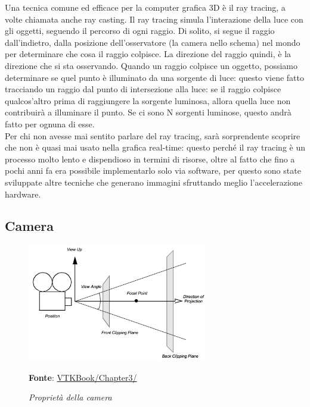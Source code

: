 Una tecnica comune ed efficace per la computer grafica 3D è il ray tracing, a volte chiamata anche ray casting. Il ray tracing simula l'interazione della luce con gli oggetti, seguendo il percorso di ogni raggio. Di solito, si segue il raggio dall'indietro, dalla posizione dell'osservatore (la camera nello schema) nel mondo per determinare che cosa il raggio colpisce. La direzione del raggio quindi, è la direzione che si sta osservando. Quando un raggio colpisce un oggetto, possiamo determinare se quel punto è illuminato da una sorgente di luce: questo viene fatto tracciando un raggio dal punto di intersezione alla luce: se il raggio colpisce qualcos'altro prima di raggiungere la sorgente luminosa, allora quella luce non contribuirà a illuminare il punto. Se ci sono N sorgenti luminose, questo andrà fatto per ognuna di esse.
\\
Per chi non avesse mai sentito parlare del ray tracing, sarà sorprendente scoprire che non è quasi mai usato nella grafica real-time: questo perché il ray tracing è un processo molto lento e dispendioso in termini di risorse, oltre al fatto che fino a pochi anni fa era possibile implementarlo solo via software, per questo sono state sviluppate altre tecniche che generano immagini sfruttando meglio l'accelerazione hardware.

\subsection{Camera}
\begin{figure}[h]
    \centering
    \includegraphics[width=0.7\textwidth]{immagini/volumerendering/camera.png}
    \caption{\textit{Proprietà della camera}}
    \textbf{Fonte}: \href{https://lorensen.github.io/VTKExamples/site/VTKBook/03Chapter3/}{VTKBook/Chapter3/}
    \label{fig: Proprietà Camera}
\end{figure}


